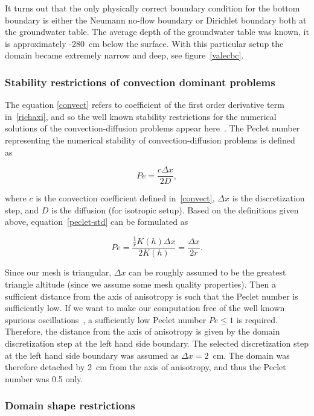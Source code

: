 \documentclass[review]{elsarticle}
\newenvironment{lineq}
    {\begin{linenomath*}
    \begin{equation}
    }
    { 
    \end{equation} 
    \end{linenomath*}
    }
\begin{document}
It turns out that the only physically correct boundary condition for the bottom boundary is either the Neumann no-flow boundary or Dirichlet boundary both at the groundwater table. The average depth of the groundwater table was known, it is approximately -280~cm below the surface. With this particular setup the domain became extremely narrow and deep, see figure~\ref{valecbc}.


\subsubsection{Stability restrictions of convection dominant problems}
\label{restrconvect}

The equation \eqref{convect} refers to coefficient  of the first order derivative term in~\eqref{richaxi}, and so the well known stability restrictions for the numerical solutions of the convection-diffusion problems appear here~\cite{zienkiewicz1976}.
The Peclet number representing the numerical stability of convection-diffusion problems is defined as~\citep{knobloch2008} 
\begin{lineq}
\label{peclet-std}
Pe = \frac{c \Delta x}{2 D},
\end{lineq}
where $c$ is the convection coefficient defined in~\eqref{convect}, $\Delta x$ is the discretization step, and $D$ is the diffusion (for isotropic setup). Based on the definitions given above, equation~\eqref{peclet-std} can be formulated as
\begin{lineq}
Pe =  \frac{\frac{1}{r}K(h) \Delta x}{2K(h)} = \frac{\Delta x}{2r}.
\end{lineq}
Since our mesh is triangular, $\Delta x$ can be roughly assumed to be the greatest triangle altitude (since we assume some mesh quality properties). Then a sufficient distance from the axis of anisotropy is such that the Peclet number is sufficiently low. If we want to make our computation free of the well known spurious oscillations~\cite{zienkiewicz1976, roos-layers}, a sufficiently low Peclet number $Pe\le 1$ is required. Therefore, the distance from the axis of anisotropy is given by the domain discretization step at the left hand side boundary. The selected discretization step at the left hand side boundary was assumed as $\Delta x=2$~cm. The domain was therefore detached by 2~cm from the axis of anisotropy, and thus the Peclet number was 0.5 only.


\subsubsection{Domain shape restrictions}
\end{document}
